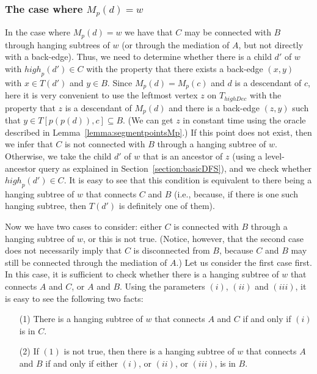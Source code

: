 \documentclass[11pt,a4paper]{article}
\begin{document}
\subsubsection{The case where $M_p(d)=w$}
\label{section:caseM(c)=wM(d)=w}
In the case where $M_p(d)=w$ we have that $C$ may be connected with $B$ through hanging subtrees of $w$ (or through the mediation of $A$, but not directly with a back-edge). Thus, we need to determine whether there is a child $d'$ of $w$ with $\mathit{high}_p(d')\in C$ with the property that there exists a back-edge $(x,y)$ with $x\in T(d')$ and $y\in B$. Since $M_p(d)=M_p(c)$ and $d$ is a descendant of $c$, here it is very convenient to use the leftmost vertex $z$ on $T_\mathit{highDec}$ with the property that $z$ is a descendant of $M_p(d)$ and there is a back-edge $(z,y)$ such that $y\in T[p(p(d)),c]\subseteq B$. (We can get $z$ in constant time using the oracle described in Lemma~\ref{lemma:segmentpointsMp}.) If this point does not exist, then we infer that $C$ is not connected with $B$ through a hanging subtree of $w$. Otherwise, we take the child $d'$ of $w$ that is an ancestor of $z$ (using a level-ancestor query as explained in Section~\ref{section:basicDFS}), and we check whether $\mathit{high}_p(d')\in C$. It is easy to see that this condition is equivalent to there being a hanging subtree of $w$ that connects $C$ and $B$ (i.e., because, if there is one such hanging subtree, then $T(d')$ is definitely one of them). 

Now we have two cases to consider: either $C$ is connected with $B$ through a hanging subtree of $w$, or this is not true. (Notice, however, that the second case does not necessarily imply that $C$ is disconnected from $B$, because $C$ and $B$ may still be connected through the mediation of $A$.) Let us consider the first case first. In this case, it is sufficient to check whether there is a hanging subtree of $w$ that connects $A$ and $C$, or $A$ and $B$. Using the parameters $(i)$, $(ii)$ and $(iii)$, it is easy to see the following two facts:

\begin{itemize}
\item[(1)]{There is a hanging subtree of $w$ that connects $A$ and $C$ if and only if $(i)$ is in $C$.}
\item[(2)]{If $(1)$ is not true, then there is a hanging subtree of $w$ that connects $A$ and $B$ if and only if either $(i)$, or $(ii)$, or $(iii)$, is in $B$.}
\end{itemize}
\end{document}
